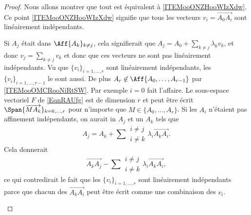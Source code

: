 \begin{proof}
	Nous allons montrer que tout est équivalent à \ref{ITEMooONZHooWIzXdw}. Ce point \ref{ITEMooONZHooWIzXdw} signifie que tous les vecteurs \( v_i=\overrightarrow{A_0A_i}\) sont linéairement indépendants.
	\begin{subproof}
		Si \( A_j\) était dans \( \Aff\{ A_k \}_{k\neq j }\), cela signifierait que \( A_j=A_0+\sum_{k\neq j}\lambda_kv_k\), et donc \( v_j=\sum_{k\neq j}v_k\) et donc que ces vecteurs ne sont pas linéairement indépendants.
		Vu que \( \{ v_i \}_{i=1,\ldots,r}\) sont linéairement indépendants, les \( \{ v_i \}_{i=1,\ldots,r-1}\) le sont aussi. De plus \( A_r\not\in\Aff\{ A_0,\ldots,A_{r-1} \}\) par \ref{ITEMooOMCRooNiRtSW}.
		Par exemple \( i=0\) fait l'affaire.
		Le sous-espace vectoriel \( F\) de \eqref{EqnRAUfg} est de dimension \( r\) et peut être écrit \( \Span\{ \overrightarrow{MA_k} \}_{k=0,\ldots,r}\) pour n'importe que \( M\in\{ A_0,\ldots,A_r \}\).
		Si les \( A_i\) n'étaient pas affinement indépendants, on aurait in \( A_j\) et un \( A_k\) tels que
		\begin{equation}
			A_j=A_k+\sum\substack{ i\neq j \\ i\neq k }\lambda_i \overrightarrow{A_kA_i} .
		\end{equation}
		Cela donnerait
		\begin{equation}
			\overrightarrow{A_kA_j}-\sum\substack{ i\neq j \\ i\neq k } \lambda_i\overrightarrow{A_kA_i},
		\end{equation}
		ce qui contredirait le fait que les \( \{ v_i \}_{i=1,\ldots,r}\) sont linéairement indépendants parce que chacun des \( \overrightarrow{A_kA_i}\) peut être écrit comme une combinaison des \( v_i\).

\end{subproof}
\end{proof}
